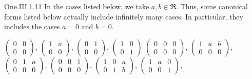 \begin{ans}{One.III.1.11}
      In the cases listed below, we take $a,b\in\Re$.
      Thus, some canonical forms
      listed below actually include infinitely many cases.
      In particular, they includes the cases $a=0$ and $b=0$.
      \begin{exparts}
        \partsitem
          $\begin{pmatrix}
            0  &0  \\
            0  &0
          \end{pmatrix}$,
          $\begin{pmatrix}
            1  &a  \\
            0  &0
          \end{pmatrix}$,
          $\begin{pmatrix}
            0  &1  \\
            0  &0
          \end{pmatrix}$,
          $\begin{pmatrix}
            1  &0  \\
            0  &1
          \end{pmatrix}$
        \partsitem
          $\begin{pmatrix}
               0  &0  &0  \\
               0  &0  &0
             \end{pmatrix}$,
          $\begin{pmatrix}
               1  &a  &b  \\
               0  &0  &0
             \end{pmatrix}$,
          $\begin{pmatrix}
               0  &1  &a  \\
               0  &0  &0
             \end{pmatrix}$,
          $\begin{pmatrix}
               0  &0  &1  \\
               0  &0  &0
             \end{pmatrix}$,
          $\begin{pmatrix}
               1  &0  &a  \\
               0  &1  &b
             \end{pmatrix}$,
          $\begin{pmatrix}
               1  &a  &0  \\
               0  &0  &1
             \end{pmatrix}$,

\end{exparts}
\end{ans}

